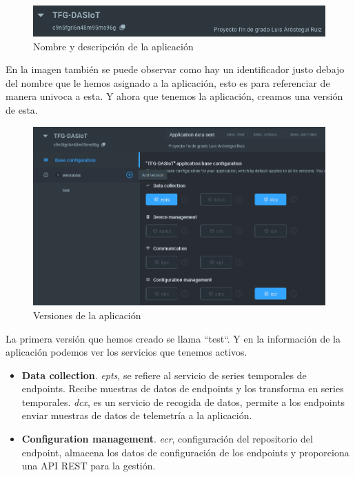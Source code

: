 \begin{figure}[hb!]
    \centering
    \includegraphics[width=\linewidth]{imagenes/app-creada.png}
    \caption{Nombre y descripción de la aplicación}
    \label{fig:figure6}
\end{figure}

En la imagen también se puede observar como hay un identificador justo debajo del nombre que le hemos asignado a la aplicación, esto es para referenciar de manera univoca a esta. Y ahora que tenemos la aplicación, creamos una versión de esta.

\begin{figure}[ht!]
    \centering
    \includegraphics[width=\linewidth]{imagenes/app-version.png}
    \caption{Versiones de la aplicación}
    \label{fig:figure7}
\end{figure}

La primera versión que hemos creado se llama ``test``. Y en la información de la aplicación podemos ver los servicios que tenemos activos.

\begin{itemize}
    \item \textbf{Data collection}. \textit{epts}, se refiere al servicio de series temporales de endpoints. Recibe muestras de datos de endpoints y los transforma en series temporales. \textit{dcx}, es un servicio de recogida de datos, permite a los endpoints enviar muestras de datos de telemetría a la aplicación.
    \item \textbf{Configuration management}. \textit{ecr}, configuración del repositorio del endpoint, almacena los datos de configuración de los endpoints y proporciona una API REST para la gestión.
\end{itemize}

